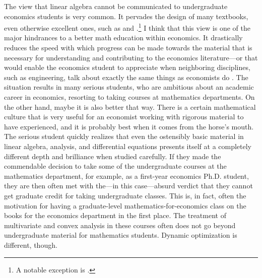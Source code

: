 \documentclass[10pt]{article}
\begin{document}
The view that linear algebra cannot be communicated to undergraduate economics students is very common. It pervades the design of many textbooks, even otherwise excellent ones, such as \cite{Sydsaeter2022} and \cite{Sydsaeter2008}.\footnote{A notable exception is \cite{Simon1994}.} I think that this view is one of the major hindrances to a better math education within economics. It drastically reduces the speed with which progress can be made towards the material that is necessary for understanding and contributing to the economics literature---or that would enable the economics student to appreciate when neighboring disciplines, such as engineering, talk about exactly the same things as economists do \citep{Luenberger1969}. The situation results in many serious students, who are ambitious about an academic career in economics, resorting to taking courses at mathematics departments. On the other hand, maybe it is also better that way. There is a certain mathematical culture that is very useful for an economist working with rigorous material to have experienced, and it is probably best when it comes from the horse's mouth. The serious student quickly realizes that even the ostensibly basic material in linear algebra, analysis, and differential equations presents itself at a completely different depth and brilliance when studied carefully. If they made the commendable decision to take some of the undergraduate courses at the mathematics department, for example, as a first-year economics Ph.D. student, they are then often met with the---in this case---absurd verdict that they cannot get graduate credit for taking undergraduate classes. This is, in fact, often the motivation for having a graduate-level mathematics-for-economics class on the books for the economics department in the first place. The treatment of multivariate and convex analysis in these courses often does not go beyond undergraduate material for mathematics students. Dynamic optimization is different, though.
\end{document}
